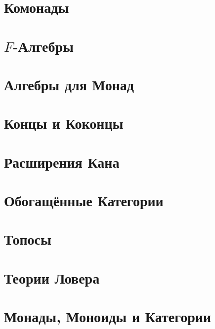 \chapter{Комонады}\label{comonads}


\chapter{$F$-Алгебры}\label{f-algebras}


\chapter{Алгебры для Монад}\label{algebras-for-monads}


\chapter{Концы и Коконцы}\label{ends-and-coends}


\chapter{Расширения Кана}\label{kan-extensions}


\chapter{Обогащённые Категории}\label{enriched-categories}


\chapter{Топосы}\label{topoi}


\chapter{Теории Ловера}\label{lawvere-theories}


\chapter{Монады, Моноиды и Категории}\label{monads-monoids-categories}


\backmatter

